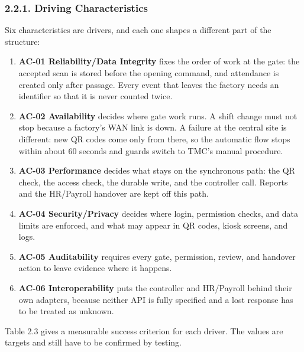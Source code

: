 \subsubsection*{2.2.1. Driving Characteristics}

{}


Six characteristics are drivers, and each one shapes a different part of the structure:

\begin{enumerate}[leftmargin=36pt, itemsep=2pt, topsep=4pt, parsep=2pt]
  \item \textbf{AC-01 Reliability/Data Integrity} fixes the order of work at the gate: the accepted scan is stored before the opening command, and attendance is created only after passage. Every event that leaves the factory needs an identifier so that it is never counted twice.
  \item \textbf{AC-02 Availability} decides where gate work runs. A shift change must not stop because a factory's WAN link is down. A failure at the central site is different: new QR codes come only from there, so the automatic flow stops within about 60 seconds and guards switch to TMC's manual procedure.
  \item \textbf{AC-03 Performance} decides what stays on the synchronous path: the QR check, the access check, the durable write, and the controller call. Reports and the HR/Payroll handover are kept off this path.
  \item \textbf{AC-04 Security/Privacy} decides where login, permission checks, and data limits are enforced, and what may appear in QR codes, kiosk screens, and logs.
  \item \textbf{AC-05 Auditability} requires every gate, permission, review, and handover action to leave evidence where it happens.
  \item \textbf{AC-06 Interoperability} puts the controller and HR/Payroll behind their own adapters, because neither API is fully specified and a lost response has to be treated as unknown.
\end{enumerate}

Table 2.3 gives a measurable success criterion for each driver. The values are targets and still have to be confirmed by testing.

